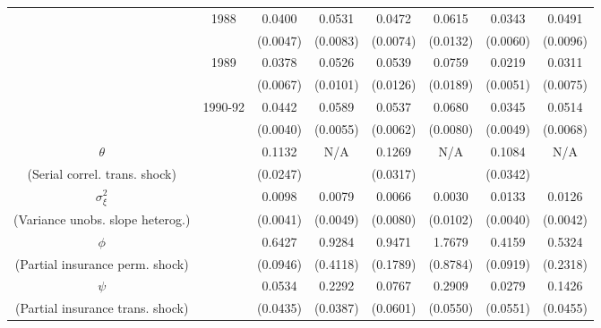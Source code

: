 \begin{table}
\begin{center}
{\begin{tabular}{cccc|cc|cc}
\\  & 1988 & 0.0400 &   0.0531 & 0.0472 &   0.0615 & 0.0343 &   0.0491
\\  &                    & (0.0047) & (0.0083)  & (0.0074) & (0.0132)  & (0.0060) & (0.0096) 
\\  & 1989 & 0.0378 &   0.0526 & 0.0539 &   0.0759 & 0.0219 &   0.0311
\\  &                    & (0.0067) & (0.0101)  & (0.0126) & (0.0189)  & (0.0051) & (0.0075) 
\\  & 1990-92 & 0.0442 &   0.0589 & 0.0537 &   0.0680 & 0.0345 &   0.0514 
\\  &         & (0.0040) & (0.0055) & (0.0062) & (0.0080) & (0.0049) & (0.0068) 
\\ \hline  
 $\theta$ &     & 0.1132 &   N/A & 0.1269 &   N/A & 0.1084 &   N/A 
\\ (Serial correl. trans. shock) &     & (0.0247) &  & (0.0317) &  & (0.0342) &  
\\ $\sigma^2_{\xi}$ &     & 0.0098 &   0.0079 & 0.0066 &   0.0030 & 0.0133 &   0.0126 
\\ (Variance unobs. slope heterog.) &     & (0.0041) & (0.0049) & (0.0080) & (0.0102) & (0.0040) & (0.0042) 
\\ \hline  
 $\phi$ &     & 0.6427 &   0.9284 & 0.9471 &   1.7679 & 0.4159 &   0.5324 
\\ (Partial insurance perm. shock) &     & (0.0946) & (0.4118) & (0.1789) & (0.8784) & (0.0919) & (0.2318) 
\\ $\psi$ &     & 0.0534 &   0.2292 & 0.0767 &   0.2909 & 0.0279 &   0.1426 
\\ (Partial insurance trans. shock) &     & (0.0435) & (0.0387) & (0.0601) & (0.0550) & (0.0551) & (0.0455) 
\\ \hline  
 \end{tabular}   
 } 
 \usebox{\ReplicationTable}  
\settowidth\TableWidth{\usebox{\ReplicationTable}} %
\end{center}  
\end{table}  
